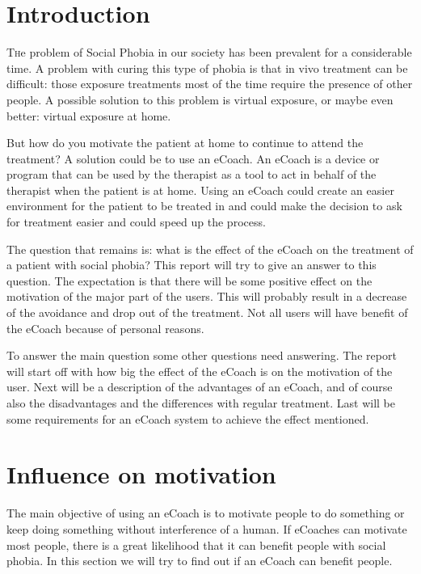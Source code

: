 \documentclass[twoside]{article}
\begin{document}
\begin{multicols}{2} %

\section{Introduction}

\lettrine[nindent=0em,lines=3]{T}he problem of Social Phobia in our society has been prevalent for a considerable time. A problem with curing this type of phobia is that in vivo treatment can be difficult: those exposure treatments most of the time require the presence of other people. A possible solution to this problem is virtual exposure, or maybe even better: virtual exposure at home.

But how do you motivate the patient at home to continue to attend the treatment? A solution could be to use an eCoach. An eCoach is a device or program that can be used by the therapist as a tool to act in behalf of the therapist when the patient is at home. Using an eCoach could create an easier environment for the patient to be treated in and could make the decision to ask for treatment easier and could speed up the process.

The question that remains is: what is the effect of the eCoach on the treatment of a patient with social phobia? This report will try to give an answer to this question. The expectation is that there will be some positive effect on the motivation of the major part of the users. This will probably result in a decrease of the avoidance and drop out of the treatment. Not all users will have benefit of the eCoach because of personal reasons.

To answer the main question some other questions need answering. The report will start off with how big the effect of the eCoach is on the motivation of the user. Next will be a description of the advantages of an eCoach, and of course also the disadvantages and the differences with regular treatment. Last will be some requirements for an eCoach system to achieve the effect mentioned.


\section{Influence on motivation}
The main objective of using an eCoach is to motivate people to do something or keep doing something without interference of a human\cite{rosset2005}. If eCoaches can motivate most people, there is a great likelihood that it can benefit people with social phobia. In this section we will try to find out if an eCoach can benefit people.


\end{multicols}
\end{document}
